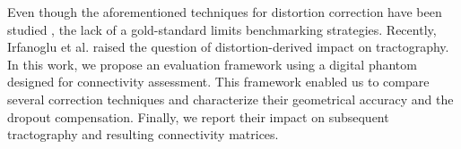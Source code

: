 Even though the aforementioned techniques for distortion correction
have been studied \cite{zeng_image_2002,wu_comparison_2008},
the lack of a gold-standard limits benchmarking
strategies. Recently, Irfanoglu et al.
\cite{irfanoglu_effects_2012} raised the question
of distortion-derived impact on tractography.
In this work, we propose an evaluation framework
using a digital phantom designed for connectivity assessment.
This framework enabled us to compare several correction 
techniques and characterize their geometrical accuracy 
and the dropout compensation. Finally, we report their 
impact on subsequent tractography and resulting connectivity
matrices.